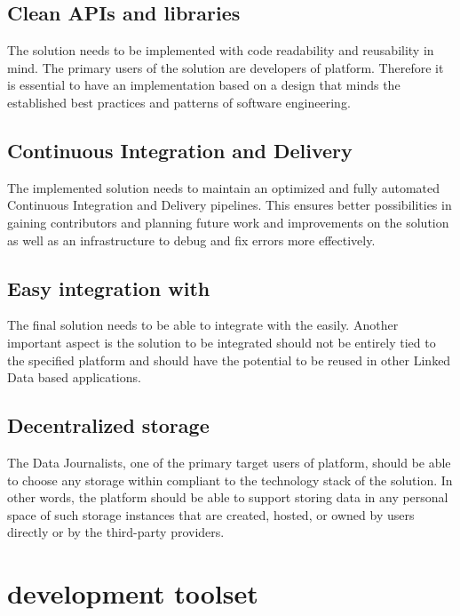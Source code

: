 \subsection{Clean APIs and libraries}

The solution needs to be implemented with code readability and reusability in mind. The primary users of the solution are developers of \lpa{} platform. Therefore it is essential to have an implementation based on a design that minds the established best practices and patterns of software engineering. 

\subsection{Continuous Integration and Delivery}

The implemented solution needs to maintain an optimized and fully automated Continuous Integration and Delivery pipelines. This ensures better possibilities in gaining contributors and planning future work and improvements on the solution as well as an infrastructure to debug and fix errors more effectively.

\subsection{Easy integration with \lpa{}}

The final solution needs to be able to integrate with the \lpa{} easily. Another important aspect is the solution to be integrated should not be entirely tied to the specified \lpa{} platform and should have the potential to be reused in other Linked Data based applications.

\subsection{Decentralized storage}

The Data Journalists, one of the primary target users of \lpa{} platform, should be able to choose any storage within compliant to the technology stack of the solution. In other words, the platform should be able to support storing data in any personal space of such storage instances that are created, hosted, or owned by users directly or by the third-party providers.

\section{\solid{} development toolset}

